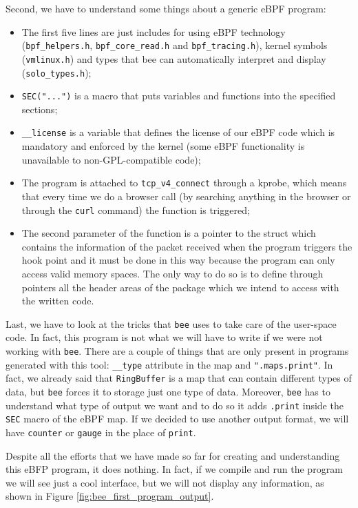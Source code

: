 Second, we have to understand some things about a generic eBPF program:

\begin{itemize}
	\item The first five lines are just includes for using eBPF technology
		(\verb|bpf_helpers.h|, \verb|bpf_core_read.h| and \verb|bpf_tracing.h|), kernel symbols (\verb|vmlinux.h|) and types that bee can automatically interpret and display (\verb|solo_types.h|);
	\item \verb|SEC("...")| is a macro that puts variables and functions into the
		specified sections;
	\item \verb|__license| is a variable that defines the license of our eBPF code
		which is mandatory and enforced by the kernel (some eBPF functionality is unavailable to non-GPL-compatible code);
	\item The program is attached to \verb|tcp_v4_connect| through a kprobe, which
		means that every time we do a browser call (by searching anything in the browser or through the \verb|curl| command) the function is triggered;
	\item The second parameter of the function is a pointer to the struct which
		contains the information of the packet received when the program triggers the hook point and it must be done in this way because the program can only access valid memory spaces.
		The only way to do so is to define through pointers all the header areas of the package which we intend to access with the written code.
\end{itemize}

Last, we have to look at the tricks that \verb|bee| uses to take care of the user-space code.
In fact, this program is not what we will have to write if we were not working with \verb|bee|.
There are a couple of things that are only present in programs generated with this tool: \verb|__type| attribute in the map and \verb|".maps.print"|.
In fact, we already said that \verb|RingBuffer| is a map that can contain different types of data, but \verb|bee| forces it to storage just one type of data.
Moreover, \verb|bee| has to understand what type of output we want and to do so it adds \verb|.print| inside the \verb|SEC| macro of the eBPF map.
If we decided to use another output format, we will have \verb|counter| or \verb|gauge| in the place of \verb|print|.

Despite all the efforts that we have made so far for creating and understanding this eBFP program, it does nothing.
In fact, if we compile and run the program we will see just a cool interface, but we will not display any information, as shown in Figure \ref{fig:bee_first_program_output}.


